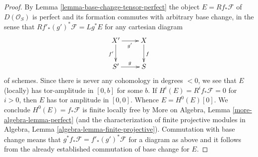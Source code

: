\documentclass{stacks-project}
\theoremstyle{plain}
\theoremstyle{definition}
\theoremstyle{remark}
\numberwithin{equation}{subsection}
\begin{document}
\begin{proof}
By Lemma \ref{lemma-base-change-tensor-perfect}
the object $E = Rf_*\mathcal{F}$ of $D(\mathcal{O}_S)$
is perfect and its formation commutes with arbitrary base change,
in the sense that $Rf'_*(g')^*\mathcal{F} = Lg^*E$
for any cartesian diagram
$$
\xymatrix{
X' \ar[r]_{g'} \ar[d]_{f'} &
X \ar[d]^f \\
S' \ar[r]^g &
S
}
$$
of schemes.
Since there is never any cohomology in degrees $< 0$, we see that
$E$ (locally) has tor-amplitude in $[0, b]$ for some $b$.
If $H^i(E) = R^if_*\mathcal{F} = 0$ for $i > 0$,
then $E$ has tor amplitude in $[0, 0]$. Whence
$E = H^0(E)[0]$. We conclude $H^0(E) = f_*\mathcal{F}$
is finite locally free by
More on Algebra, Lemma \ref{more-algebra-lemma-perfect}
(and the characterization of finite projective modules
in Algebra, Lemma \ref{algebra-lemma-finite-projective}).
Commutation with base change means that
$g^*f_*\mathcal{F} = f'_*(g')^*\mathcal{F}$ for
a diagram as above and it follows from the already
established commutation of base change for $E$.
\end{proof}
\end{document}
